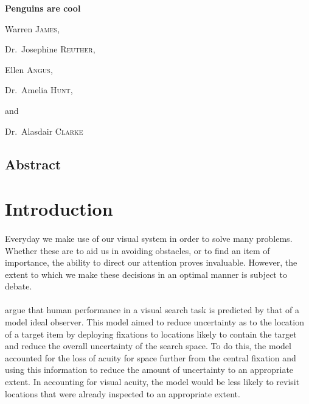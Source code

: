 \documentclass[12pt]{article}
\begin{document}
\begin{titlepage}
	\centering
	{\huge\bfseries Penguins are cool\par}
	\vspace{1cm}
	Warren \textsc{James}, \par
	Dr.~Josephine \textsc{Reuther}, \par
	Ellen \textsc{Angus}, \par
	Dr.~Amelia \textsc{Hunt},\par
	and\par
	Dr.~Alasdair \textsc{Clarke}
	\vfill
\end{titlepage}	


\newpage

\begin{center}
	\section*{Abstract}
\end{center}

\begingroup\singlespacing
\newpage
\tableofcontents
\newpage
\endgroup

\section*{Introduction}
\paragraph{} Everyday we make use of our visual system in order to solve many problems. Whether these are to aid us in avoiding obstacles, or to find an item of importance, the ability to direct our attention proves invaluable. However, the extent to which we make these decisions in an optimal manner is subject to debate. 

\paragraph{} \cite{najemnik2005optimal} argue that human performance in a visual search task is predicted by that of a model ideal observer. This model aimed to reduce uncertainty as to the location of a target item by deploying fixations to locations likely to contain the target and reduce the overall uncertainty of the search space. To do this, the model accounted for the loss of acuity for space further from the central fixation and using this information to reduce the amount of uncertainty to an appropriate extent. In accounting for visual acuity, the model would be less likely to revisit locations that were already inspected to an appropriate extent. 
\end{document}
